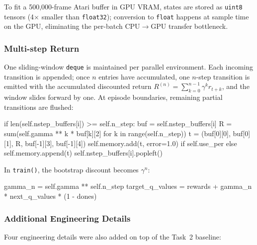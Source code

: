 \documentclass[12pt,a4paper]{report}
\begin{document}
To fit a 500{,}000-frame Atari buffer in GPU VRAM, states are stored as
\texttt{uint8} tensors (4$\times$ smaller than \texttt{float32});
conversion to \texttt{float} happens at sample time on the GPU, eliminating
the per-batch CPU$\to$GPU transfer bottleneck.

\subsubsection*{Multi-step Return}

One sliding-window \texttt{deque} is maintained per parallel environment.
Each incoming transition is appended; once $n$ entries have accumulated,
one $n$-step transition is emitted with the accumulated discounted return
$R^{(n)} = \sum_{k=0}^{n-1} \gamma^k r_{t+k}$, and the window slides forward by one.
At episode boundaries, remaining partial transitions are flushed:

\begin{pycode}
if len(self.nstep_buffers[i]) >= self.n_step:
    buf = self.nstep_buffers[i]
    R   = sum(self.gamma ** k * buf[k][2] for k in range(self.n_step))
    t   = (buf[0][0], buf[0][1], R, buf[-1][3], buf[-1][4])
    self.memory.add(t, error=1.0) if self.use_per else self.memory.append(t)
    self.nstep_buffers[i].popleft()
\end{pycode}

In \texttt{train()}, the bootstrap discount becomes $\gamma^n$:

\begin{pycode}
gamma_n         = self.gamma ** self.n_step
target_q_values = rewards + gamma_n * next_q_values * (1 - dones)
\end{pycode}

\subsubsection*{Additional Engineering Details}

Four engineering details were also added on top of the Task~2 baseline:
\end{document}
